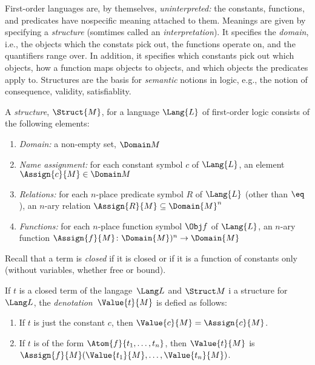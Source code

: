 \documentclass[../../include/open-logic-section]{subfiles}
\begin{document}

\begin{wordy}
First-order languages are, by themselves, \emph{uninterpreted:} the
constants, functions, and predicates have nospecific meaning attached
to them.  Meanings are given by specifying a \emph{structure}
(somtimes called an \emph{interpretation}).  It specifies the
\emph{domain}, i.e., the objects which the constats pick out, the
functions operate on, and the quantifiers range over. In addition, it
specifies which constants pick out which objects, how a function maps
objects to objects, and which objects the predicates apply to.
Structures are the basis for \emph{semantic} notions in logic, e.g.,
the notion of consequence, validity, satisfiablity.
\end{wordy}

\begin{defn}[Structure]
A \emph{structure}, $\Struct{M}$, for a language $\Lang{L}$ of
first-order logic consists of the following elements:
\begin{enumerate}
\item \emph{Domain:} a non-empty set, $\Domain M$ 
\item \emph{Name assignment:} for each constant symbol $c$ of
  $\Lang{L}$, an element $\Assign{c}{M} \in \Domain M$
\item \emph{Relations:} for each $n$-place predicate symbol $R$ of
  $\Lang{L}$ (other than $\eq$), an $n$-ary relation $\Assign{R}{M}
  \subseteq \Domain{M}^n$
\item \emph{Functions:} for each $n$-place function symbol $\Obj f$ of
  $\Lang{L}$, an $n$-ary function $\Assign{f}{M} \colon
  \Domain{M})^n \to \Domain{M}$
  
\end{enumerate}
\end{defn}

\begin{wordy}
Recall that a term is \emph{closed} if it is closed or if it is a
function of constants only (without variables, whether free or bound).
\end{wordy}

\begin{defn}
If $t$ is a closed term of the langage~$\Lang L$ and $\Struct M$ i a
structure for~$\Lang L$, the \emph{denotation}~$\Value{t}{M}$ is
defied as follows:
\begin{enumerate}
\item If $t$ is just the constant $c$, then $\Value{c}{M} = \Assign{c}{M}$.
\item If $t$ is of the form $\Atom{f}{t_1, \ldots, t_n}$, then
  $\Value{t}{M}$ is $\Assign{f}{M}(\Value{t_1}{M}, \ldots,
  \Value{t_n}{M})$.
\end{enumerate}
\end{defn}
\end{document}
